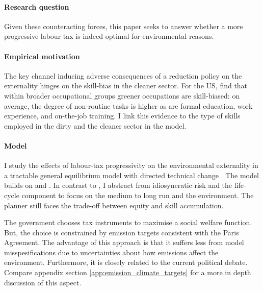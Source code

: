 \paragraph{Research question}
Given these counteracting forces, this paper seeks to answer whether a more progressive labour tax is indeed optimal for environmental reasons. 

\paragraph{Empirical motivation}
The key channel inducing adverse consequences of a reduction policy on the externality hinges on the skill-bias in the cleaner sector. %
For the US, \cite{Consoli2016DoCapital} find that within broader occupational groups greener occupations are skill-biased: on average, the degree of non-routine tasks is higher as are formal education, work experience, and on-the-job training. I link this evidence to the type of skills employed in the dirty and the cleaner sector in the model. %


\paragraph{Model}
I study the effects of labour-tax progressivity  on the environmental externality in a tractable general equilibrium model with directed technical change . The model builds on \cite{Heathcote2017OptimalFramework} and \cite{Acemoglu2012TheChange}.
In contrast to \cite{Heathcote2017OptimalFramework}, I abstract from idiosyncratic risk and the life-cycle component to focus on the medium to long run and the environment. 
The planner still faces the trade-off between equity and skill accumulation. 

The government chooses tax instruments to maximise a 
social welfare function. But, the choice is constrained by emission targets consistent with the Paris Agreement. The advantage of this approach is that it suffers less from  model misspesifications due to  uncertainties about how emissions affect the environment. Furthermore, it is closely related to the current political debate. Compare appendix section \ref{app:emission_climate_targets} for a more in depth discussion of this aspect.  


